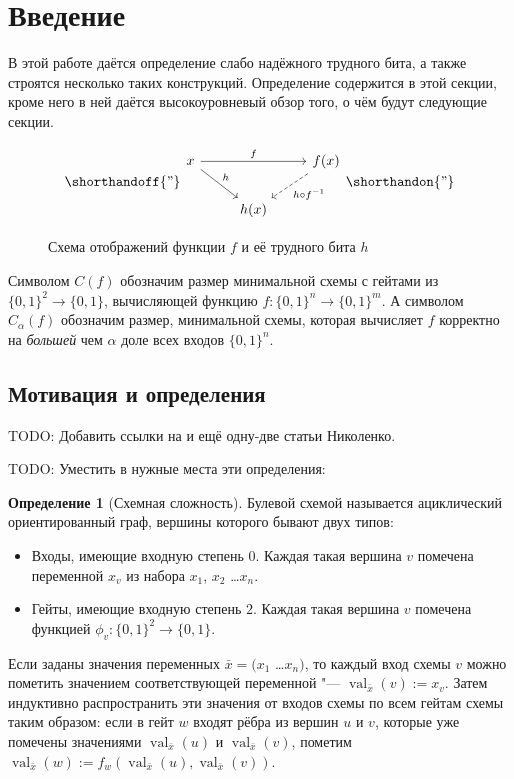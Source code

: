 \documentclass[oneside, a4paper]{article}
\theoremstyle{definition}
\newtheorem{definition}{Определение}
\theoremstyle{remark}
\DeclareMathOperator*{\val}{val}
\begin{document}
\section{Введение}

В этой работе даётся определение слабо надёжного трудного бита, а также
строятся несколько таких конструкций. Определение содержится в этой секции,
кроме него в ней даётся высокоуровневый обзор того, о чём будут следующие
секции.

\begin{figure}[h]
\[
\shorthandoff{"}
\begin{tikzcd}
x \arrow[rr, "f"] \arrow[rd, "h"] & ~ & f(x) \arrow[ld, dashrightarrow, "h \circ f^{-1}"] \\
~ & h(x) & ~
\end{tikzcd}
\shorthandon{"}
\]
\caption{Схема отображений функции $f$ и её трудного бита $h$}
\end{figure}


Символом $C(f)$ обозначим размер минимальной схемы с гейтами из $\{0, 1\}^2 \to
\{0, 1\}$, вычисляющей функцию $f : \{0, 1\}^n \to \{0, 1\}^m$. А символом
$C_\alpha(f)$ обозначим размер, минимальной схемы, которая вычисляет $f$
корректно на \emph{большей} чем $\alpha$ доле всех входов $\{0, 1\}^n$.

\subsection{Мотивация и определения}

TODO: Добавить ссылки на \cite{hirsch_milanich_nikolenko} и ещё одну-две статьи
Николенко.

TODO: Уместить в нужные места эти определения:

\begin{definition}[Схемная сложность]
Булевой схемой называется ациклический ориентированный граф, вершины которого
бывают двух типов:
\begin{itemize}
\item Входы, имеющие входную степень $0$. Каждая такая вершина $v$ помечена
  переменной $x_v$ из набора $x_1$, $x_2$ \dots $x_n$.
\item Гейты, имеющие входную степень $2$. Каждая такая вершина $v$ помечена
  функцией $\phi_v : \{0, 1\}^2 \to \{0, 1\}$.
\end{itemize}

Если заданы значения переменных $\bar{x} = (x_1$ \dots $x_n)$, то каждый вход
схемы $v$ можно пометить значением соответствующей переменной "--- $\val_{\bar
x}(v) := x_v$. Затем индуктивно распространить эти значения от входов схемы по
всем гейтам схемы таким образом: если в гейт $w$ входят рёбра из вершин $u$ и
$v$, которые уже помечены значениями $\val_{\bar x}(u)$ и $\val_{\bar x}(v)$,
пометим $\val_{\bar x}(w) := f_w(\val_{\bar x}(u), \val_{\bar x}(v))$.

\end{definition}
\end{document}
